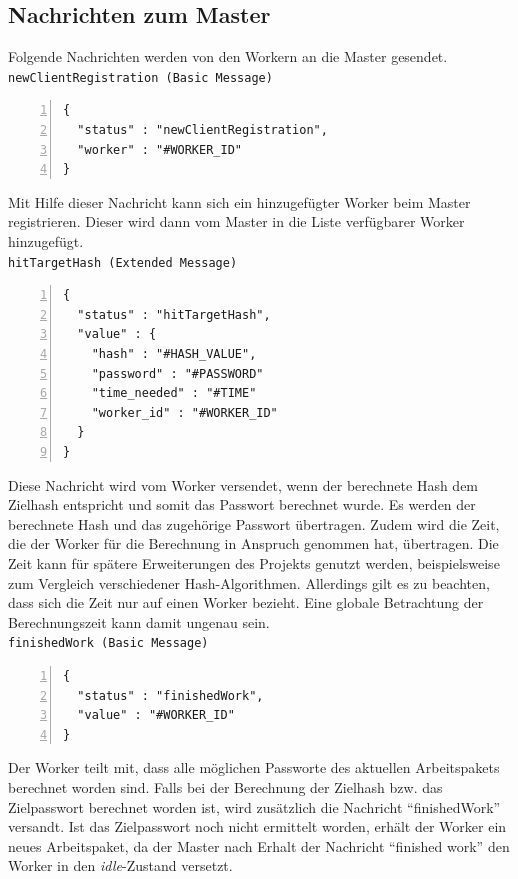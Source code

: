 \subsection{Nachrichten zum Master}
Folgende Nachrichten werden von den Workern an die Master gesendet. \\

\texttt{newClientRegistration (Basic Message)}
\begin{lstlisting}[basicstyle=\ttfamily,numbers=left,numberstyle=\footnotesize\ttfamily,backgroundcolor=\color{sourcegray}]
{
  "status" : "newClientRegistration",
  "worker" : "#WORKER_ID"
}
\end{lstlisting}
Mit Hilfe dieser Nachricht kann sich ein hinzugefügter Worker beim Master registrieren. Dieser wird dann vom Master in die Liste verfügbarer Worker hinzugefügt.\\

\texttt{hitTargetHash (Extended Message)}
\begin{lstlisting}[basicstyle=\ttfamily,numbers=left,numberstyle=\footnotesize\ttfamily,backgroundcolor=\color{sourcegray}]
{
  "status" : "hitTargetHash",
  "value" : {
    "hash" : "#HASH_VALUE",
    "password" : "#PASSWORD"
    "time_needed" : "#TIME"
    "worker_id" : "#WORKER_ID"
  }
}\end{lstlisting}
Diese Nachricht wird vom Worker versendet, wenn der berechnete Hash dem Zielhash entspricht und somit das Passwort berechnet wurde. Es werden der berechnete Hash und das zugehörige Passwort übertragen. Zudem wird die Zeit, die der Worker für die Berechnung in Anspruch genommen hat, übertragen. Die Zeit kann für spätere Erweiterungen des Projekts genutzt werden, beispielsweise zum Vergleich verschiedener Hash-Algorithmen. Allerdings gilt es zu beachten, dass sich die Zeit nur auf einen Worker bezieht. Eine globale Betrachtung der Berechnungszeit kann damit ungenau sein. \\

\texttt{finishedWork (Basic Message)}
\begin{lstlisting}[basicstyle=\ttfamily,numbers=left,numberstyle=\footnotesize\ttfamily,backgroundcolor=\color{sourcegray}]
{
  "status" : "finishedWork",
  "value" : "#WORKER_ID"
}
\end{lstlisting}
Der Worker teilt mit, dass alle möglichen Passworte des aktuellen Arbeitspakets berechnet worden sind. Falls bei der Berechnung der Zielhash bzw. das Zielpasswort berechnet worden ist, wird zusätzlich die Nachricht \enquote{finishedWork} versandt. Ist das Zielpasswort noch nicht ermittelt worden, erhält der Worker ein neues Arbeitspaket, da der Master nach Erhalt der Nachricht \enquote{finished work} den Worker in den \emph{idle}-Zustand versetzt. \\


